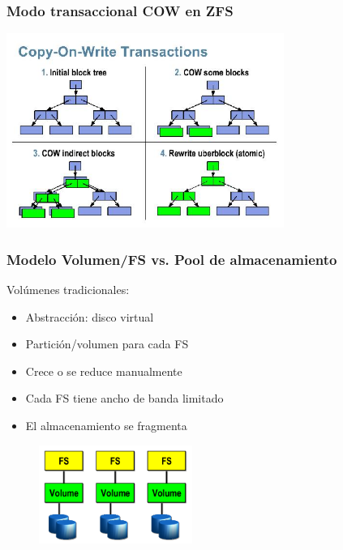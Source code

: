 \documentclass{beamer}
\begin{document}
\begin{frame}
  \frametitle{Modo transaccional COW en ZFS}

  \begin{center}
    \includegraphics[height=2.5in]{figs/cow.jpg}
  \end{center}
\end{frame}



\begin{frame}
  \frametitle{Modelo Volumen/FS vs. Pool de almacenamiento}

Volúmenes tradicionales:

  \begin{itemize}
    \item Abstracción: disco virtual 
    \item Partición/volumen para cada FS      
    \item Crece o se reduce manualmente
    \item Cada FS tiene ancho de banda limitado
    \item El almacenamiento se fragmenta 
  \end{itemize}

\begin{figure}[h]
\begin{center}
  \includegraphics[width=5cm]{figs/volumes2.png}
\end{center}
\end{figure}

\end{frame}
\end{document}

